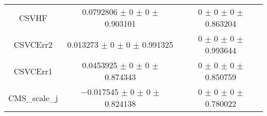 \begin{table}
\begin{tabular}{ccc}
CSVHF & \num{0.0792806} $\pm$ \num{0} $\pm$ \num{0} $\pm$ \num{0.903101} & \num{0} $\pm$ \num{0} $\pm$ \num{0} $\pm$ \num{0.863204}\\
CSVCErr2 & \num{0.013273} $\pm$ \num{0} $\pm$ \num{0} $\pm$ \num{0.991325} & \num{0} $\pm$ \num{0} $\pm$ \num{0} $\pm$ \num{0.993644}\\
CSVCErr1 & \num{0.0453925} $\pm$ \num{0} $\pm$ \num{0} $\pm$ \num{0.874343} & \num{0} $\pm$ \num{0} $\pm$ \num{0} $\pm$ \num{0.850759}\\
CMS\_scale\_j & \num{-0.017545} $\pm$ \num{0} $\pm$ \num{0} $\pm$ \num{0.824138} & \num{0} $\pm$ \num{0} $\pm$ \num{0} $\pm$ \num{0.780022}\\
\bottomrule
\end{tabular}
\end{table}